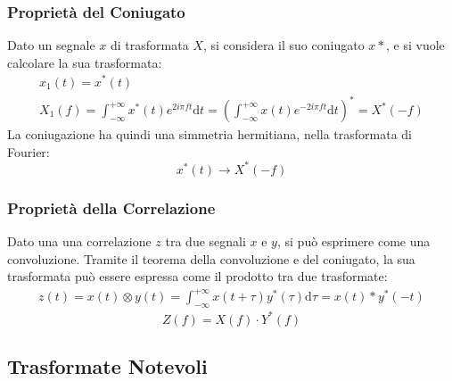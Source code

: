 \documentclass{article}
\newcommand{\df}{\mathrm{d}}
\numberwithin{equation}{subsection}
\begin{document}
\subsubsection{Proprietà del Coniugato}

Dato un segnale $x$ di trasformata $X$, si considera il suo coniugato $x*$, e si vuole calcolare la sua trasformata:
\begin{gather*}
    x_1(t)=x^*(t)\\
    X_1(f)=\displaystyle\int_{-\infty}^{+\infty}x^*(t)e^{2i\pi ft}\df t=\left(\int_{-\infty}^{+\infty}x(t)e^{-2i\pi ft}\df t\right)^*=X^*(-f)
\end{gather*}
La coniugazione ha quindi una simmetria hermitiana, nella trasformata di Fourier: 
\begin{equation}
    x^*(t)\to X^*(-f)
\end{equation}

\subsubsection{Proprietà della Correlazione}

Dato una una correlazione $z$ tra due segnali $x$ e $y$, si può esprimere come una convoluzione. Tramite il teorema della convoluzione e del coniugato, la sua trasformata può 
essere espressa come il prodotto tra due trasformate: 
\begin{gather*}
    z(t)=x(t)\otimes y(t)=\displaystyle\int_{-\infty}^{+\infty}x(t+\tau)y^*(\tau)\df\tau=x(t)*y^*(-t)
\end{gather*}
\begin{equation}
    Z(f)=X(f)\cdot Y^*(f)
\end{equation}

\subsection{Trasformate Notevoli}
\end{document}
